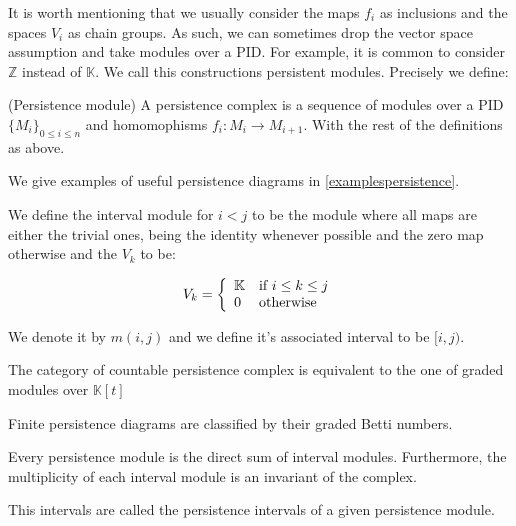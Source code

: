 It is worth mentioning that we usually consider the maps $f_i$
as inclusions and the spaces $V_i$ as chain groups. As such, we
can sometimes drop the vector space assumption and take 
modules over a PID. For example, it is common to consider $\mathbb{Z}$
instead of $\mathbb{K}$. We call this constructions
persistent modules. Precisely we define:

\begin{definition}(Persistence module)
A persistence complex is a sequence of modules
over a PID
$\{M_i\}_{0\leq i \leq n}$ and homomophisms $f_i:M_i\to M_{i+1}$. 
With the rest of the definitions as above.

\end{definition}

We give examples of useful persistence diagrams in \ref{examplespersistence}.

\begin{example}
We define the interval module for $i<j$
to be the module where all maps are either the trivial ones, 
being the identity whenever possible and the zero map otherwise and 
the $V_k$ to be:

$$
V_k
=
\left\{
\begin{array}{l l}
\mathbb{K} & \text{if } i\leq k\leq j\\
0 & \text{otherwise} 
\end{array}
\right.
$$


We denote it by $m(i,j)$
and we define it's associated interval to be $[i,j)$.

\end{example}



\begin{proposition}\cite{zomcar2002}
The category of countable persistence complex is equivalent to the one of graded modules over
$\mathbb{K}[t]$
\end{proposition}

\begin{proposition}\cite{zomcar2002}
Finite persistence diagrams are classified by 
their graded Betti numbers.

\end{proposition}

\begin{proposition}\cite{zomcar2002}
Every persistence module is the direct sum of interval modules.
Furthermore, the multiplicity of each interval module is an invariant
of the complex.

This intervals are called the persistence intervals of a given 
persistence module.
\end{proposition}

